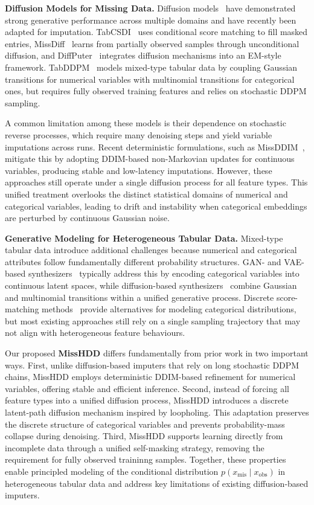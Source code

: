 \documentclass[times, review, 10pt]{elsarticle}
\begin{document}
\textbf{Diffusion Models for Missing Data.}
Diffusion models~\cite{dm1,chang2025design,dreview1} have demonstrated strong generative performance across multiple domains and have recently been adapted for imputation. TabCSDI~\cite{tabcsdi} uses conditional score matching to fill masked entries, MissDiff~\cite{missdiff} learns from partially observed samples through unconditional diffusion, and DiffPuter~\cite{diffputer} integrates diffusion mechanisms into an EM-style framework. TabDDPM~\cite{tabddpm} models mixed-type tabular data by coupling Gaussian transitions for numerical variables with multinomial transitions for categorical ones, but requires fully observed training features and relies on stochastic DDPM sampling.

A common limitation among these models is their dependence on stochastic reverse processes, which require many denoising steps and yield variable imputations across runs. Recent deterministic formulations, such as MissDDIM~\cite{missddim}, mitigate this by adopting DDIM-based non-Markovian updates for continuous variables, producing stable and low-latency imputations. However, these approaches still operate under a single diffusion process for all feature types. This unified treatment overlooks the distinct statistical domains of numerical and categorical variables, leading to drift and instability when categorical embeddings are perturbed by continuous Gaussian noise.



\textbf{Generative Modeling for Heterogeneous Tabular Data.}
Mixed-type tabular data introduce additional challenges because numerical and categorical attributes follow fundamentally different probability structures. GAN- and VAE-based synthesizers~\cite{tvae,ctgan,tablegan} typically address this by encoding categorical variables into continuous latent spaces, while diffusion-based synthesizers~\cite{tabddpm} combine Gaussian and multinomial transitions within a unified generative process. Discrete score-matching methods~\cite{sun2022score,campbell2022continuous} provide alternatives for modeling categorical distributions, but most existing approaches still rely on a single sampling trajectory that may not align with heterogeneous feature behaviours.

Our proposed \textbf{MissHDD} differs fundamentally from prior work in two important ways. First, unlike diffusion-based imputers that rely on long stochastic DDPM chains, MissHDD employs deterministic DDIM-based refinement for numerical variables, offering stable and efficient inference. Second, instead of forcing all feature types into a unified diffusion process, MissHDD introduces a discrete latent-path diffusion mechanism inspired by loopholing. This adaptation preserves the discrete structure of categorical variables and prevents probability-mass collapse during denoising. Third, MissHDD supports learning directly from incomplete data through a unified self-masking strategy, removing the requirement for fully observed traininng samples. Together, these properties enable principled modeling of the conditional distribution \(p(x_{\text{mis}} \mid x_{\text{obs}})\) in heterogeneous tabular data and address key limitations of existing diffusion-based imputers.
\end{document}
